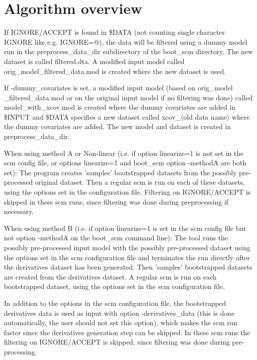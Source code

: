 \section{Algorithm overview}

If IGNORE/ACCEPT is found in \$DATA (not counting single character IGNORE like e.g. IGNORE=@), 
the data will be filtered using a dummy model run in the preprocess\_data\_dir subdirectory of the boot\_scm directory. The new dataset is called
 filtered.dta. A modified input model called orig\_model\_filtered\_data.mod is created where the new dataset is used.

If -dummy\_covariates is set, a modified input model (based on orig\_model\\\_filtered\_data.mod or on the original input model if no filtering was done) 
called model\_with\_xcov.mod is created where the dummy covariates are added in \$INPUT and \$DATA specifies a new dataset called xcov\_$\langle$old 
data name$\rangle$ where the dummy covariates are added. The new model and dataset is created in preprocess\_data\_dir. 

When using method A or Non-linear (i.e. if option linearize=1 is not set in the scm config file, 
or options linearize=1 and boot\_scm option -methodA are both set): The program creates 'samples' bootstrapped datasets from the possibly pre-processed 
original dataset. Then a regular scm is run on each of these datasets, using the options set in the configuration file. Filtering on IGNORE/ACCEPT is skipped 
in these scm runs, since filtering was done during preprocessing if necessary. 

When using method B (i.e. if option linearize=1 is set in the scm config file but not option -methodA on the boot\_scm command line): 
The tool runs the possibly pre-processed input model with the possibly pre-processed dataset using the options set in the scm configuration 
file and terminates the run directly after the derivatives dataset has been generated. Then 'samples' bootstrapped datasets are created from the 
derivatives dataset. 
A regular scm is run on each bootstrapped dataset, using the options set in the scm configuration file. 

In addition to the options in the scm configuration file, 
the bootstrapped derivatives data is used as input with option -derivatives\_data (this is done automatically, the user should not set this option), 
which makes the scm run faster since the derivatives generation step can be skipped. In these scm runs the filtering on IGNORE/ACCEPT is skipped, 
since filtering was done during pre-processing. 

